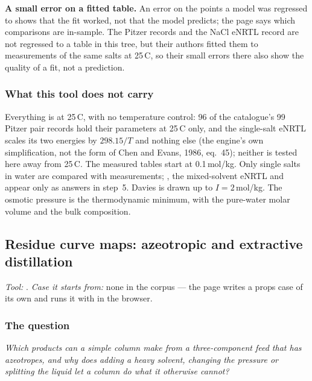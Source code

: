 \documentclass[11pt,a4paper]{article}
\begin{document}
\begin{pitfall}
\textbf{A small error on a fitted table.}  An error on the points a model was
regressed to shows that the fit worked, not that the model predicts; the
page says which comparisons are in-sample.  The Pitzer records and the NaCl eNRTL
record are not regressed to a table in this tree, but their authors fitted them to
measurements of the same salts at 25\,\textdegree C, so their small errors there
also show the quality of a fit, not a prediction.
\end{pitfall}

\subsubsection*{What this tool does not carry}

Everything is at 25\,\textdegree C, with no temperature control: 96 of the
catalogue's 99 Pitzer pair records hold their parameters at 25\,\textdegree C
only, and the single-salt eNRTL scales its two energies by $298.15/T$ and
nothing else (the engine's own simplification, not the form of Chen and Evans, 1986, eq.~45); neither is tested here away from 25\,\textdegree C.  The
measured tables start at 0.1\,mol/kg.  Only single salts in water are compared
with measurements; , the mixed-solvent eNRTL and
 appear only as answers in step~5.  Davies is drawn up to
$I = 2$\,mol/kg.  The osmotic pressure is the thermodynamic minimum, with the
pure-water molar volume and the bulk composition.

\subsection{Residue curve maps: azeotropic and extractive distillation}\label{sec:edu-residue-curves}

\noindent\textit{\small Tool:} .  \textit{\small
Case it starts from:} none in the corpus --- the page writes a props case of its
own and runs it with  in the browser.

\subsubsection*{The question}

\emph{Which products can a simple column make from a three-component feed that
has azeotropes, and why does adding a heavy solvent, changing the pressure or
splitting the liquid let a column do what it otherwise cannot?}
\end{document}
